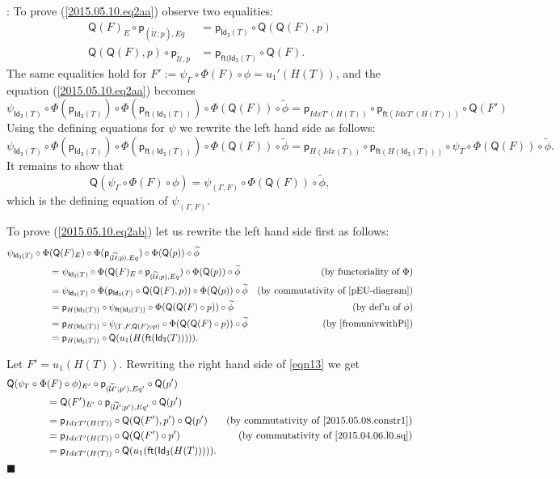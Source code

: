 \documentclass[12pt]{article}
\numberwithin{equation}{section}
\newenvironment{eq}{\begin{equation}}{\end{equation}}
\newenvironment{myproof}{{\bf Proof}:}{$\blacksquare$ \vskip 5mm }
\newcommand{\by}[1]{\text{(by #1)}}
\newcommand{\wt}{\widetilde}
\newcommand{\ft}{\mathsf{ft}}
\newcommand{\p}{\mathsf{p}}
\newcommand{\Idx}{\mathsf{Id_3}} %
\newcommand{\U}{\mathcal{U}}
\newcommand{\Q}{\mathsf{Q}}
\begin{document}
\begin{myproof}
To prove (\ref{2015.05.10.eq2aa}) observe two equalities:
\begin{align}
  \Q(F)_E\circ \p_{(\wt{\U};p),Eq} & =\p_{\Idx(T)}\circ \Q(\Q(F),p) \label{usefulequal3} \\
  \Q(\Q(F),p)\circ \p_{\wt{\U},p} & =\p_{\ft(\Idx(T)}\circ \Q(F).  \label{usefulequal4}
\end{align}
%
The same equalities hold for $F' := \psi_{\Gamma}\circ\Phi(F)\circ
\phi=u_1'(H(T))$, and the equation (\ref{2015.05.10.eq2aa}) becomes
%
$$\psi_{\Idx(T)}\circ \Phi(\p_{\Idx(T)})\circ \Phi(\p_{\ft(\Idx(T))})\circ
\Phi(\Q(F))\circ \wt{\phi}=\p_{IdxT'(H(T))}\circ \p_{\ft(IdxT'(H(T)))}\circ \Q(F')$$
%
Using the defining equations for $\psi$ we rewrite the left hand side as follows:
%
$$\psi_{\Idx(T)}\circ \Phi(\p_{\Idx(T)})\circ \Phi(\p_{\ft(\Idx(T))})\circ
\Phi(\Q(F))\circ \wt{\phi}=\p_{H(Idx(T))}\circ \p_{\ft(H(\Idx(T)))}\circ
\psi_{T}\circ \Phi(\Q(F))\circ \wt{\phi}.$$
%
It remains to show that
%
\begin{eq}
  \Q(\psi_{\Gamma}\circ \Phi(F)\circ \phi)=\psi_{(\Gamma,F)}\circ \Phi(\Q(F))\circ \wt{\phi},  \label{eqn13}
\end{eq}%
which is the defining equation of $\psi_{(\Gamma,F)}$.

To prove (\ref{2015.05.10.eq2ab}) let us rewrite the left hand side first as follows:
%
\begin{align*}
  \psi_{\Idx(T)}\circ \Phi&(\Q(F)_E)\circ \Phi(\p_{(\wt{\U};p),Eq})\circ \Phi(\Q(p))\circ \wt{\phi} \\
    & = \psi_{\Idx(T)}\circ \Phi(\Q(F)_E \circ \p_{(\wt{\U};p),Eq})\circ \Phi(\Q(p))\circ \wt{\phi} & \by{functoriality of $\Phi$} \\
    & = \psi_{\Idx(T)}\circ \Phi(\p_{\Idx(T)}\circ \Q(\Q(F),p))\circ \Phi(\Q(p))\circ\wt{\phi} & \by{commutativity of \ref{pEU-diagram}} \\
    & = \p_{H(\Idx(T))}\circ \psi_{\ft(\Idx(T))}\circ \Phi(\Q(\Q(F)\circ p))\circ \wt{\phi} & \by{def'n of $\phi$} \\
    & = \p_{H(\Idx(T))}\circ \psi_{(\Gamma,F,\Q(F)\circ p)}\circ \Phi(\Q(\Q(F)\circ p))\circ \wt{\phi} & \by{\cite[Lemma 3.2]{fromunivwithPi}} \\
    & = \p_{H(\Idx(T))}\circ \Q(u_1(H(\ft(\Idx(T))))).
\end{align*}

Let $F'=u_1(H(T))$. Rewriting the right hand side of \ref{eqn13} we get
%
\begin{align*}
  \Q(\psi_{\Gamma}\circ \Phi&(F)\circ \phi)_{E'}\circ \p_{(\wt{\U}';p'),Eq'}\circ \Q(p') \\
    & = \Q(F')_{E'}\circ \p_{(\wt{\U}';p'),Eq'}\circ \Q(p') \\
    & = \p_{IdxT'(H(T))}\circ \Q(\Q(F'),p')\circ \Q(p') & \by{commutativity of \ref{2015.05.08.constr1}} \\
    & = \p_{IdxT'(H(T))}\circ \Q(\Q(F')\circ p') & \by{commutativity of \ref{2015.04.06.l0.sq}} \\
    & = \p_{IdxT'(H(T))}\circ \Q(u_1(\ft(\Idx(H(T))))).
\end{align*}
\end{myproof}
\end{document}
